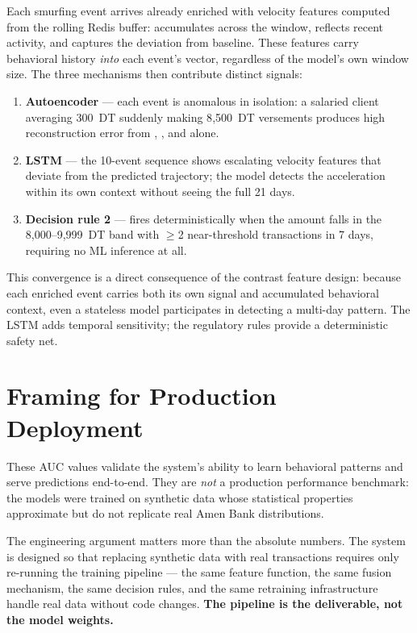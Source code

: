 Each smurfing event arrives already enriched with velocity features computed from the rolling Redis buffer:  accumulates across the window,  reflects recent activity, and  captures the deviation from baseline. These features carry behavioral history \emph{into} each event's vector, regardless of the model's own window size. The three mechanisms then contribute distinct signals:

\begin{enumerate}
  \item \textbf{Autoencoder} --- each event is anomalous in isolation: a salaried client averaging 300~DT suddenly making 8{,}500~DT versements produces high reconstruction error from , , and  alone.
  \item \textbf{LSTM} --- the 10-event sequence shows escalating velocity features that deviate from the predicted trajectory; the model detects the acceleration within its own context without seeing the full 21 days.
  \item \textbf{Decision rule 2} --- fires deterministically when the amount falls in the 8{,}000--9{,}999~DT band with $\geq$2 near-threshold transactions in 7 days, requiring no ML inference at all.
\end{enumerate}

This convergence is a direct consequence of the contrast feature design: because each enriched event carries both its own signal and accumulated behavioral context, even a stateless model participates in detecting a multi-day pattern. The LSTM adds temporal sensitivity; the regulatory rules provide a deterministic safety net.

\section{Framing for Production Deployment}

These AUC values validate the system's ability to learn behavioral patterns and serve predictions end-to-end. They are \emph{not} a production performance benchmark: the models were trained on synthetic data whose statistical properties approximate but do not replicate real Amen Bank distributions.

The engineering argument matters more than the absolute numbers. The system is designed so that replacing synthetic data with real transactions requires only re-running the training pipeline --- the same feature function, the same fusion mechanism, the same decision rules, and the same retraining infrastructure handle real data without code changes. \textbf{The pipeline is the deliverable, not the model weights.}
